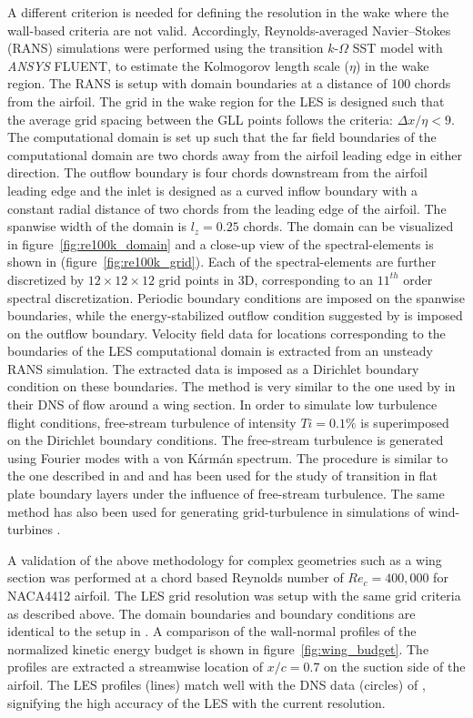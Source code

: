 A different criterion is needed for defining the resolution in the wake where the wall-based criteria are not valid. Accordingly, Reynolds-averaged Navier--Stokes (RANS) simulations were performed using the transition $k$-$\Omega$ SST model with \textit{ANSYS}\textsuperscript{\textregistered} FLUENT, to estimate the Kolmogorov length scale ($\eta$) in the wake region. The RANS is setup with domain boundaries at a distance of 100 chords from the airfoil. The grid in the wake region for the LES is designed such that the average grid spacing between the GLL points follows the criteria: $\Delta x/\eta < 9$. The computational domain is set up such that the far field boundaries of the computational domain are two chords away from the airfoil leading edge in either direction. The outflow boundary is four chords downstream from the airfoil leading edge and the inlet is designed as a curved inflow boundary with a constant radial distance of two chords from the leading edge of the airfoil. The spanwise width of the domain is $l_{z}=0.25$ chords. The domain can be visualized in figure~\ref{fig:re100k_domain} and a close-up view of the spectral-elements is shown in (figure~\ref{fig:re100k_grid}). Each of the spectral-elements are further discretized by $12\times12\times12$ grid points in 3D, corresponding to an $11^{th}$ order spectral discretization. Periodic boundary conditions are imposed on the spanwise boundaries, while the energy-stabilized outflow condition suggested by \cite{dong2014} is imposed on the outflow boundary. Velocity field data for locations corresponding to the boundaries of the LES computational domain is extracted from an unsteady RANS simulation. The extracted data is imposed as a Dirichlet boundary condition on these boundaries. The method is very similar to the one used by \cite{hosseini16} in their DNS of flow around a wing section. In order to simulate low turbulence flight conditions, free-stream turbulence of intensity $Ti=0.1\%$ is superimposed on the Dirichlet boundary conditions. The free-stream turbulence is generated using Fourier modes with a von K\'arm\'an spectrum. The procedure is similar to the one described in \cite{schlatterdiploma,brandt04} and \cite{schlatter08} and has been used for the study of transition in flat plate boundary layers under the influence of free-stream turbulence. The same method has also been used for generating grid-turbulence in simulations of wind-turbines \citep{kleusberglicenciate}.

A validation of the above methodology for complex geometries such as a wing section was performed at a chord based Reynolds number of $Re_{c}=400,000$ for NACA4412 airfoil. The LES grid resolution was setup with the same grid criteria as described above. The domain boundaries and boundary conditions are identical to the setup in \cite{hosseini16}. A comparison of the wall-normal profiles of the normalized kinetic energy budget is shown in figure~\ref{fig:wing_budget}. The profiles are extracted a streamwise location of $x/c=0.7$ on the suction side of the airfoil. The LES profiles (lines) match well with the DNS data (circles) of \cite{hosseini16}, signifying the high accuracy of the LES with the current resolution.

